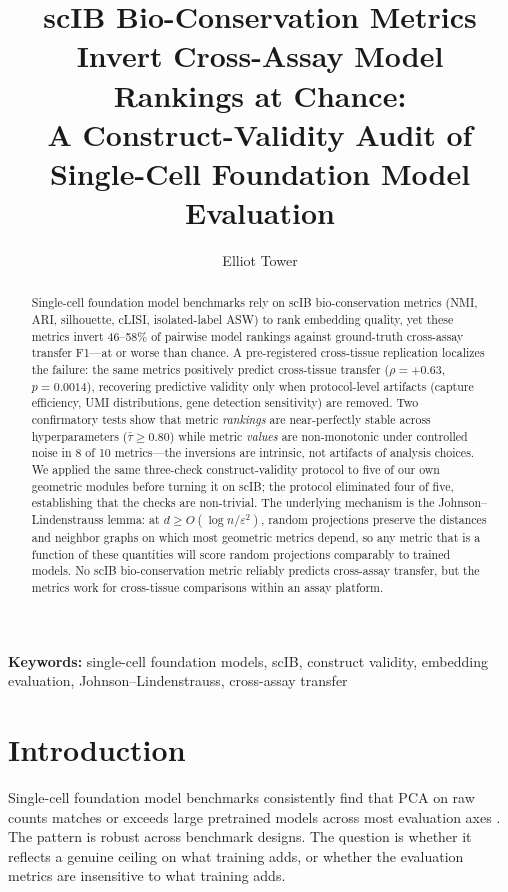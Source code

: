 \documentclass[11pt]{article}
\title{scIB Bio-Conservation Metrics Invert Cross-Assay Model Rankings at Chance:\\A Construct-Validity Audit of Single-Cell Foundation Model Evaluation}
\author{Elliot Tower}
\affil{Independent Researcher \\ \texttt{elliot@elliottower.ai}}
\date{}
\begin{document}
\linenumbers
\maketitle

\begin{abstract}
Single-cell foundation model benchmarks rely on scIB bio-conservation metrics (NMI, ARI, silhouette, cLISI, isolated-label ASW) to rank embedding quality, yet these metrics invert 46--58\% of pairwise model rankings against ground-truth cross-assay transfer F1---at or worse than chance. A pre-registered cross-tissue replication localizes the failure: the same metrics positively predict cross-tissue transfer ($\rho = +0.63$, $p = 0.0014$), recovering predictive validity only when protocol-level artifacts (capture efficiency, UMI distributions, gene detection sensitivity) are removed. Two confirmatory tests show that metric \emph{rankings} are near-perfectly stable across hyperparameters ($\bar{\tau} \geq 0.80$) while metric \emph{values} are non-monotonic under controlled noise in 8 of 10 metrics---the inversions are intrinsic, not artifacts of analysis choices. We applied the same three-check construct-validity protocol to five of our own geometric modules before turning it on scIB; the protocol eliminated four of five, establishing that the checks are non-trivial. The underlying mechanism is the Johnson--Lindenstrauss lemma: at $d \geq O(\log n / \varepsilon^2)$, random projections preserve the distances and neighbor graphs on which most geometric metrics depend, so any metric that is a function of these quantities will score random projections comparably to trained models. No scIB bio-conservation metric reliably predicts cross-assay transfer, but the metrics work for cross-tissue comparisons within an assay platform.
\end{abstract}

\noindent\textbf{Keywords:} single-cell foundation models, scIB, construct validity, embedding evaluation, Johnson--Lindenstrauss, cross-assay transfer


\section{Introduction}
\label{sec:intro}

Single-cell foundation model benchmarks consistently find that PCA on raw counts matches or exceeds large pretrained models across most evaluation axes \citep{wu2025scfm, vcbench2026, unifiedscfm2026, cellxgeneintegration2026}. The pattern is robust across benchmark designs. The question is whether it reflects a genuine ceiling on what training adds, or whether the evaluation metrics are insensitive to what training adds.
\end{document}
